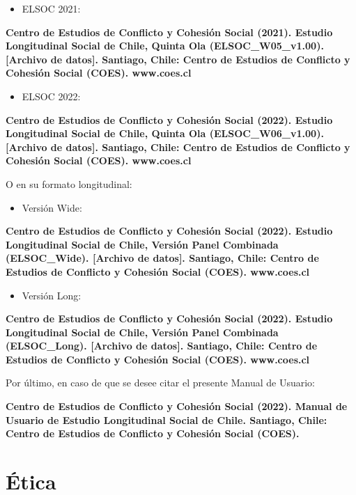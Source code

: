 \documentclass[
  12pt,
]{article}
\providecommand{\tightlist}{%
  \setlength{\itemsep}{0pt}\setlength{\parskip}{0pt}}
\begin{document}
\begin{itemize}
\tightlist
\item
  ELSOC 2021:
\end{itemize}

\textbf{Centro de Estudios de Conflicto y Cohesión Social (2021). Estudio Longitudinal Social de Chile, Quinta Ola (ELSOC\_W05\_v1.00). {[}Archivo de datos{]}. Santiago, Chile: Centro de Estudios de Conflicto y Cohesión Social (COES). www.coes.cl}

\begin{itemize}
\tightlist
\item
  ELSOC 2022:
\end{itemize}

\textbf{Centro de Estudios de Conflicto y Cohesión Social (2022). Estudio Longitudinal Social de Chile, Quinta Ola (ELSOC\_W06\_v1.00). {[}Archivo de datos{]}. Santiago, Chile: Centro de Estudios de Conflicto y Cohesión Social (COES). www.coes.cl}

O en su formato longitudinal:

\begin{itemize}
\tightlist
\item
  Versión Wide:
\end{itemize}

\textbf{Centro de Estudios de Conflicto y Cohesión Social (2022). Estudio Longitudinal Social de Chile, Versión Panel Combinada (ELSOC\_Wide). {[}Archivo de datos{]}. Santiago, Chile: Centro de Estudios de Conflicto y Cohesión Social (COES). www.coes.cl}

\begin{itemize}
\tightlist
\item
  Versión Long:
\end{itemize}

\textbf{Centro de Estudios de Conflicto y Cohesión Social (2022). Estudio Longitudinal Social de Chile, Versión Panel Combinada (ELSOC\_Long). {[}Archivo de datos{]}. Santiago, Chile: Centro de Estudios de Conflicto y Cohesión Social (COES). www.coes.cl}

Por último, en caso de que se desee citar el presente Manual de Usuario:

\textbf{Centro de Estudios de Conflicto y Cohesión Social (2022). Manual de Usuario de Estudio Longitudinal Social de Chile. Santiago, Chile: Centro de Estudios de Conflicto y Cohesión Social (COES).}

\newpage

\hypertarget{uxe9tica}{%
\section{Ética}\label{uxe9tica}}
\end{document}
